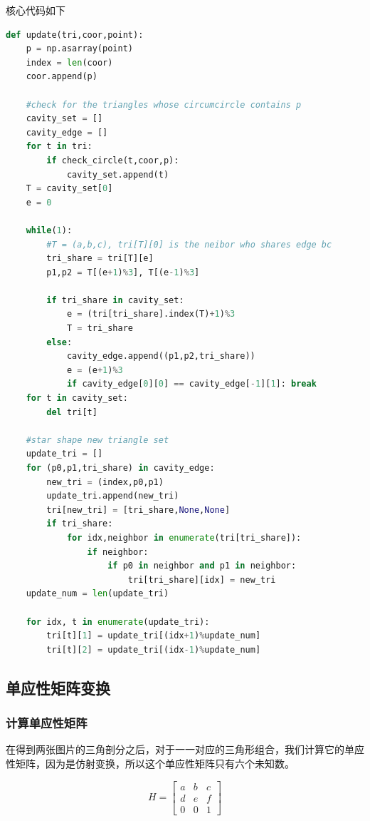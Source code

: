 \documentclass[a4paper]{article}
\begin{document}
 核心代码如下
 \begin{lstlisting}[language=Python]
def update(tri,coor,point):  
    p = np.asarray(point)
    index = len(coor)
    coor.append(p)
    
    #check for the triangles whose circumcircle contains p
    cavity_set = []
    cavity_edge = []
    for t in tri:
        if check_circle(t,coor,p):
            cavity_set.append(t)
    T = cavity_set[0]
    e = 0
    
    while(1):  
        #T = (a,b,c), tri[T][0] is the neibor who shares edge bc
        tri_share = tri[T][e]
        p1,p2 = T[(e+1)%3], T[(e-1)%3]
        
        if tri_share in cavity_set:
            e = (tri[tri_share].index(T)+1)%3
            T = tri_share
        else:
            cavity_edge.append((p1,p2,tri_share))
            e = (e+1)%3
            if cavity_edge[0][0] == cavity_edge[-1][1]: break    
    for t in cavity_set:
        del tri[t]
        
    #star shape new triangle set
    update_tri = []
    for (p0,p1,tri_share) in cavity_edge: 
        new_tri = (index,p0,p1)
        update_tri.append(new_tri) 
        tri[new_tri] = [tri_share,None,None]
        if tri_share:
            for idx,neighbor in enumerate(tri[tri_share]):
                if neighbor:
                    if p0 in neighbor and p1 in neighbor:
                        tri[tri_share][idx] = new_tri
    update_num = len(update_tri)

    for idx, t in enumerate(update_tri):
        tri[t][1] = update_tri[(idx+1)%update_num]
        tri[t][2] = update_tri[(idx-1)%update_num]
\end{lstlisting}

\subsection{单应性矩阵变换}
\subsubsection{计算单应性矩阵}
在得到两张图片的三角剖分之后，对于一一对应的三角形组合，我们计算它的单应性矩阵，因为是仿射变换，所以这个单应性矩阵只有六个未知数。

\[
H = \begin{bmatrix}a & b & c \\ d & e & f\\0&0&1 \end{bmatrix}
\]
\end{document}
